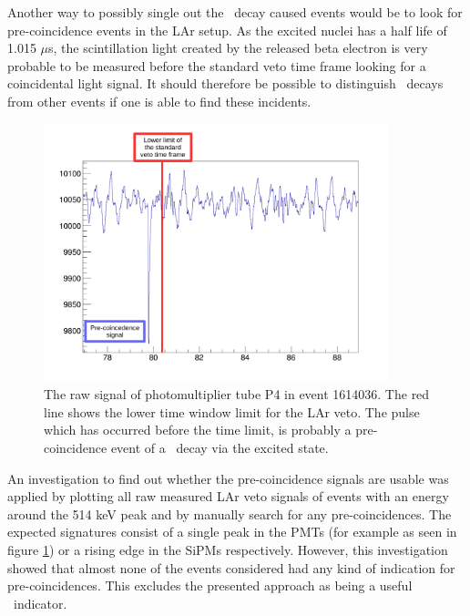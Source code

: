 \documentclass[encoding=utf8,british]{tumphthesis}
\begin{document}
Another way to possibly single out the \Kr\ decay caused events would be to look for pre-coincidence events in the LAr setup.
As the excited  nuclei has a half life of 1.015 $\mu$s, the scintillation light created by the released beta electron is very probable to be measured before the standard veto time frame looking for a coincidental light signal.
It should therefore be possible to distinguish \Kr\ decays from other events if one is able to find these incidents.
\\


\begin{figure}[t!]
	\centering
	\ifmakefigures%
	\includegraphics[width=100mm]{./Bilder/BeispielSignal.pdf}
	\fi%

	\caption{
    The raw signal of photomultiplier tube P4 in event 1614036. 
    The red line shows the lower time window limit for the LAr veto.
    The pulse which has occurred before the time limit, is probably a pre-coincidence event of a \Kr\ decay via the excited  state.
    }
    	\label{fig:BeispielSignal}
    			\vspace{5mm}
\end{figure}


An investigation to find out whether the pre-coincidence signals are usable was applied by plotting all raw measured LAr veto signals of events with an energy around the 514 keV peak and by manually search for any pre-coincidences.
The expected signatures consist of a single peak in the PMTs (for example as seen in figure \ref{fig:BeispielSignal}) or a rising edge in the SiPMs respectively.
However, this investigation showed that almost none of the events considered had any kind of indication for pre-coincidences.
This excludes the presented approach as being a useful \Kr\ indicator.

\iffalse
\end{document}
